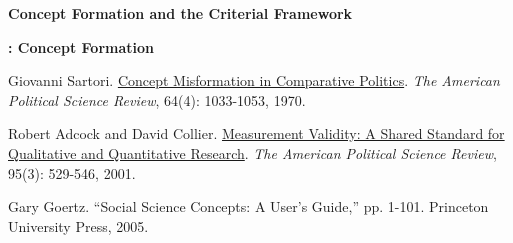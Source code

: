 \documentclass[letterpaper]{article}
\renewenvironment{itemize}{
  \begin{list}{}{
    \setlength{\leftmargin}{1.5em}
  }
}{
  \end{list}
}
\begin{document}
\begin{enumerate}
\item {\bf Concept Formation and the Criterial Framework}
		
		\begin{itemize}
		\item {\bf {\unskip}: Concept Formation}
			\begin{itemize}
				\item[$\bullet$] Giovanni Sartori. \href{https://doi.org/10.2307/1958356}{Concept Misformation in Comparative Politics}. \emph{The American Political Science Review}, 64(4): 1033-1053, 1970.
				\item[$\bullet$] Robert Adcock and David Collier. \href{http://www.jstor.org/stable/3118231}{Measurement Validity: A Shared Standard for Qualitative and Quantitative Research}. \emph{The American Political Science Review}, 95(3): 529-546, 2001.
				\item[$\bullet$] Gary Goertz. ``Social Science Concepts: A User's Guide,'' pp. 1-101. Princeton University Press, 2005. 
			\end{itemize}
		\end{itemize}






\end{enumerate}
\end{document}
